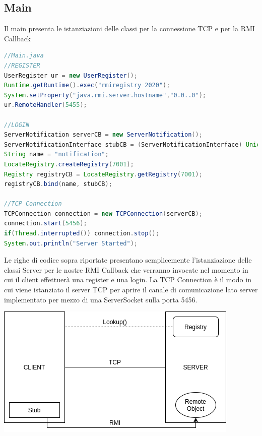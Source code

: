 \documentclass[]{article}
\begin{document}
\subsection{Main}
Il main presenta le istanziazioni delle classi per la connessione TCP e per la RMI Callback
\begin{lstlisting}[language=java]
//Main.java
//REGISTER
UserRegister ur = new UserRegister();
Runtime.getRuntime().exec("rmiregistry 2020");
System.setProperty("java.rmi.server.hostname","0.0..0");
ur.RemoteHandler(5455);

//LOGIN
ServerNotification serverCB = new ServerNotification();
ServerNotificationInterface stubCB = (ServerNotificationInterface) UnicastRemoteObject.exportObject(serverCB, 0);
String name = "notification";
LocateRegistry.createRegistry(7001);
Registry registryCB = LocateRegistry.getRegistry(7001);
registryCB.bind(name, stubCB);
	
//TCP Connection
TCPConnection connection = new TCPConnection(serverCB);
connection.start(5456);
if(Thread.interrupted()) connection.stop();
System.out.println("Server Started");
\end{lstlisting}
Le righe di codice sopra riportate presentano semplicemente l'istanziazione delle classi Server per le nostre RMI Callback che verranno invocate nel momento in cui il client effettuerà una register e una login. La TCP Connection è il modo in cui viene istanziato il server TCP per aprire il canale di comunicazione lato server implementato per mezzo di una ServerSocket sulla porta 5456.\\
\begin{center}
\includegraphics[scale=0.6]{classDiagram}
\end{center}
\end{document}
